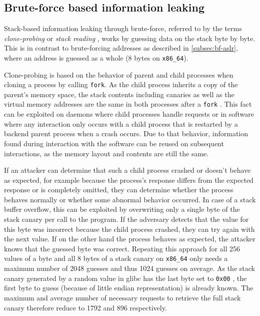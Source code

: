 \subsection{Brute-force based information leaking}
\label{subsec:bf-information-leaking}

Stack-based information leaking through brute-force, referred to by the terms \emph{clone-probing} \cite{Lu2016} or \emph{stack reading} \cite{Bittau2014}, works by guessing data on the stack byte by byte.
This is in contrast to brute-forcing addresses as described in \cref{subsec:bf-aslr}, where an address is guessed as a whole (8 bytes on \texttt{x86\_64}).

Clone-probing is based on the behavior of parent and child processes when cloning a process by calling \texttt{fork}.
As the child process inherits a copy of the parent's memory space, the stack contents including canaries as well as the virtual memory addresses are the same in both processes after a \texttt{fork} \cites[230]{Bittau2014}[1\psq]{Lu2016}{Kerrisk2020d}.
This fact can be exploited on daemons where child processes handle requests or in software where any interaction only occurs with a child process that is restarted by a backend parent process when a crash occurs.
Due to that behavior, information found during interaction with the software can be reused on subsequent interactions, as the memory layout and contents are still the same.

If an attacker can determine that such a child process crashed or doesn't behave as expected, for example because the process's response differs from the expected response or is completely omitted, they can determine whether the process behaves normally or whether some abnormal behavior occurred.
In case of a stack buffer overflow, this can be exploited by overwriting only a single byte of the stack canary per call to the program.
If the adversary detects that the value for this byte was incorrect because the child process crashed, they can try again with the next value.
If on the other hand the process behaves as expected, the attacker knows that the guessed byte was correct.
Repeating this approach for all 256 values of a byte and all 8 bytes of a stack canary on \texttt{x86\_64} only needs a maximum number of 2048 guesses and thus 1024 guesses on average.
As the stack canary generated by a random value in \gls{glibc} has the last byte set to \texttt{0x00} \cite[\texttt{sysdeps/generic/dl-osinfo.h}]{FSF2020a}, the first byte to guess (because of little endian representation) is already known.
The maximum and average number of necessary requests to retrieve the full stack canary therefore reduce to 1792 and 896 respectively.

